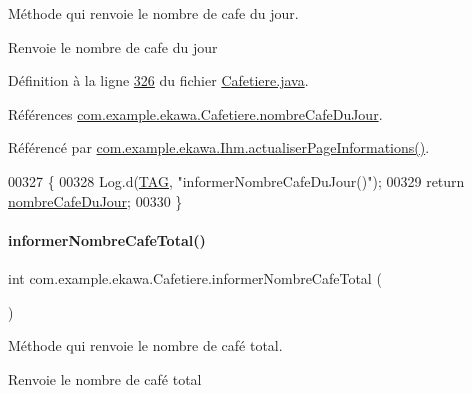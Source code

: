 Méthode qui renvoie le nombre de cafe du jour. 

\begin{DoxyReturn}{Renvoie}
le nombre de cafe du jour 
\end{DoxyReturn}


Définition à la ligne \hyperlink{_cafetiere_8java_source_l00326}{326} du fichier \hyperlink{_cafetiere_8java_source}{Cafetiere.\+java}.



Références \hyperlink{_cafetiere_8java_source_l00096}{com.\+example.\+ekawa.\+Cafetiere.\+nombre\+Cafe\+Du\+Jour}.



Référencé par \hyperlink{_ihm_8java_source_l00919}{com.\+example.\+ekawa.\+Ihm.\+actualiser\+Page\+Informations()}.


\begin{DoxyCode}
00327     \{
00328         Log.d(\hyperlink{classcom_1_1example_1_1ekawa_1_1_cafetiere_aa0c1fd99a2508b06c462aea17034aa91}{TAG}, \textcolor{stringliteral}{"informerNombreCafeDuJour()"});
00329         \textcolor{keywordflow}{return} \hyperlink{classcom_1_1example_1_1ekawa_1_1_cafetiere_a123b6fcb9a9c1decae40e026660e716b}{nombreCafeDuJour};
00330     \}
\end{DoxyCode}
\mbox{\label{classcom_1_1example_1_1ekawa_1_1_cafetiere_a01de1ada0bfd9d75e9c873ca1bdb62df}} 
\paragraph{\texorpdfstring{informer\+Nombre\+Cafe\+Total()}{informerNombreCafeTotal()}}
{\footnotesize\ttfamily int com.\+example.\+ekawa.\+Cafetiere.\+informer\+Nombre\+Cafe\+Total (\begin{DoxyParamCaption}{ }\end{DoxyParamCaption})}



Méthode qui renvoie le nombre de café total. 

\begin{DoxyReturn}{Renvoie}
le nombre de café total 
\end{DoxyReturn}


